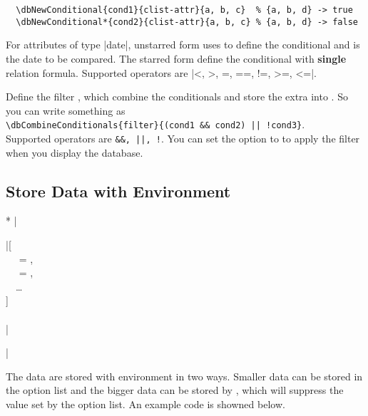 \documentclass[full]{l3doc}
\begin{document}
\begin{documentation}
\begin{verbatim}
  \dbNewConditional{cond1}{clist-attr}{a, b, c}  % {a, b, d} -> true
  \dbNewConditional*{cond2}{clist-attr}{a, b, c} % {a, b, d} -> false
\end{verbatim}

For attributes of type |date|, unstarred form uses  to
define the conditional and  is the date to be compared. The starred
form define the conditional with \textbf{single} relation formula. Supported
operators are |<, >, =, ==, !=, >=, <=|.

\begin{function}{\dbCombineConditionals}
  \begin{syntax}
       
  \end{syntax}

  Define the filter , which combine the conditionals and store the
  extra  into . So you can write something as\\
  \verb=\dbCombineConditionals{filter}{(cond1 && cond2) || !cond3}=.\\
  Supported operators are \verb=&&, ||, !=. You can set the option 
  to  to apply the filter when you display the database.
\end{function}

\subsection{Store Data with  Environment}

\noindent{}
\begin{Syntax}*
  |\begin{dbitem}|[ \\
  ~~ = , \\
  ~~ = , \\
  ~~\ldots{} \\
  ] \\
  ~~ \\
  |\end{dbitem}|
\end{Syntax}

The data are stored with  environment in two ways. Smaller data
can be stored in the option list and the bigger data can be stored by
, which will suppress the value set by the option list. An example
code is showned below.


\end{documentation}
\end{document}
